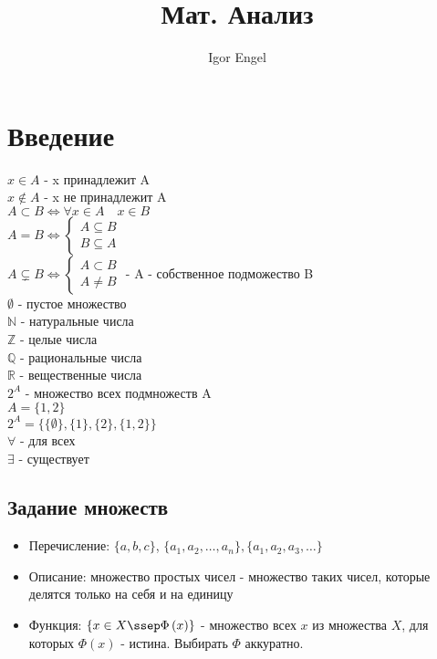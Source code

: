 \documentclass[11pt, oneside]{article}   	%
\title{Мат. Анализ}
\author{Igor Engel}
\date{}
\begin{document}
\maketitle
\section{Введение}
    $x \in A$ - x принадлежит A\\
    $x \not\in A$ - x не принадлежит A\\
    $A \subset B \iff  \forall{x \in A}\quad x \in B$\\
    $A = B \iff \begin{cases} A \subseteq B\\ B \subseteq A \end{cases}$\\
    $A \subsetneq B \iff  \begin{cases} A \subset B\\ A \neq B  \end{cases}$ - A - собственное подможество B\\
    $\emptyset$ - пустое множество\\
    $\mathbb{N}$ - натуральные числа\\
    $\mathbb{Z}$ - целые числа\\
    $\mathbb{Q}$ - рациональные числа\\
    $\mathbb{R}$ - вещественные числа\\
    $2^A$ - множество всех подмножеств A\\
    $A = \{1, 2\}$\\
    $2^{A} = \{\{\emptyset\}, \{1\}, \{2\}, \{1, 2\}\}$\\
    $\forall$ - для всех\\
    $\exists$ - существует
    \subsection{Задание множеств}
    \begin{itemize}
        \item Перечисление: $\{a, b, c\}$, $\{a_1, a_2, \ldots, a_n\},  \{a_1, a_2, a_3, \ldots\}  $ 
        \item Описание: множество простых чисел - множество таких чисел, которые делятся только на себя и на единицу
        \item Функция: $\{x \in X\ssep \Phi\left( x \right) \} $ - множество всех $x$ из множества $X$, для которых  $\Phi\left( x \right) $ - истина. Выбирать $\Phi$ аккуратно.
    \end{itemize}
\end{document}
